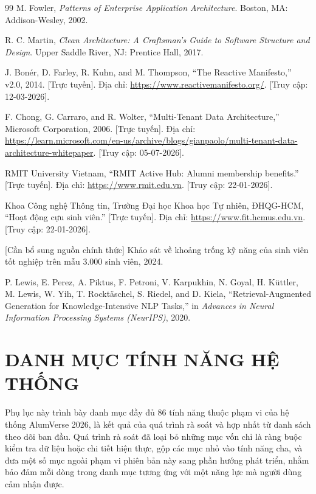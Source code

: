 \documentclass[12pt,a4paper,oneside]{report}
\begin{document}
\begin{thebibliography}{99}
 M. Fowler, \textit{Patterns of Enterprise Application Architecture}. Boston, MA: Addison-Wesley, 2002.

 R. C. Martin, \textit{Clean Architecture: A Craftsman's Guide to Software Structure and Design}. Upper Saddle River, NJ: Prentice Hall, 2017.

 J. Bonér, D. Farley, R. Kuhn, and M. Thompson, ``The Reactive Manifesto,'' v2.0, 2014. [Trực tuyến]. Địa chỉ: \url{https://www.reactivemanifesto.org/}. [Truy cập: 12-03-2026].

 F. Chong, G. Carraro, and R. Wolter, ``Multi-Tenant Data Architecture,'' Microsoft Corporation, 2006. [Trực tuyến]. Địa chỉ: \url{https://learn.microsoft.com/en-us/archive/blogs/gianpaolo/multi-tenant-data-architecture-whitepaper}. [Truy cập: 05-07-2026].

 RMIT University Vietnam, ``RMIT Active Hub: Alumni membership benefits.'' [Trực tuyến]. Địa chỉ: \url{https://www.rmit.edu.vn}. [Truy cập: 22-01-2026].

 Khoa Công nghệ Thông tin, Trường Đại học Khoa học Tự nhiên, ĐHQG-HCM, ``Hoạt động cựu sinh viên.'' [Trực tuyến]. Địa chỉ: \url{https://www.fit.hcmus.edu.vn}. [Truy cập: 22-01-2026].

 [Cần bổ sung nguồn chính thức] Khảo sát về khoảng trống kỹ năng của sinh viên tốt nghiệp trên mẫu 3.000 sinh viên, 2024.

 P. Lewis, E. Perez, A. Piktus, F. Petroni, V. Karpukhin, N. Goyal, H. Küttler, M. Lewis, W. Yih, T. Rocktäschel, S. Riedel, and D. Kiela, ``Retrieval-Augmented Generation for Knowledge-Intensive NLP Tasks,'' in \textit{Advances in Neural Information Processing Systems (NeurIPS)}, 2020.

\end{thebibliography}
\appendix
\chapter{DANH MỤC TÍNH NĂNG HỆ THỐNG}

Phụ lục này trình bày danh mục đầy đủ 86 tính năng thuộc phạm vi của hệ thống AlumVerse 2026, là kết quả của quá trình rà soát và hợp nhất từ danh sách theo dõi ban đầu. Quá trình rà soát đã loại bỏ những mục vốn chỉ là ràng buộc kiểm tra dữ liệu hoặc chi tiết hiện thực, gộp các mục nhỏ vào tính năng cha, và đưa một số mục ngoài phạm vi phiên bản này sang phần hướng phát triển, nhằm bảo đảm mỗi dòng trong danh mục tương ứng với một năng lực mà người dùng cảm nhận được.
\end{document}
